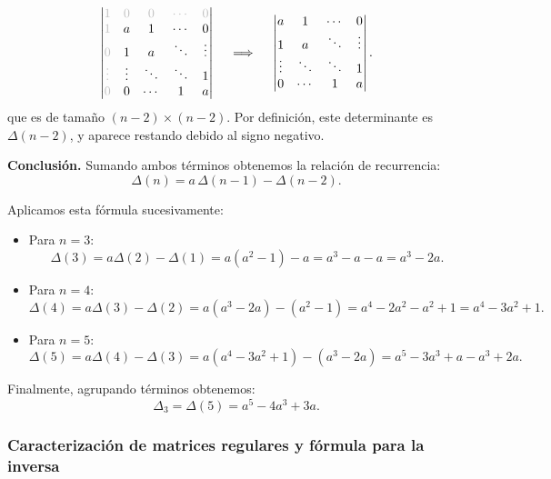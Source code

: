 \documentclass[a4paper,12pt]{article}
\begin{document}
\begin{ejercicio}[title=Ejercicio 40]
\[
\begin{vmatrix}
\color{lightgray}1 & \color{lightgray}0 & \color{lightgray}0 & \color{lightgray}\cdots & \color{lightgray}0\\
\color{lightgray}1 & a & 1 & \cdots & 0\\
\color{lightgray}0 & 1 & a & \ddots & \vdots\\
\color{lightgray}\vdots & \vdots & \ddots & \ddots & 1\\
\color{lightgray}0 & 0 & \cdots & 1 & a
\end{vmatrix}
\quad \implies \quad
\begin{vmatrix}
a & 1 & \cdots & 0\\
1 & a & \ddots & \vdots\\
\vdots & \ddots & \ddots & 1\\
0 & \cdots & 1 & a
\end{vmatrix}.
\]
que es de tamaño $(n-2)\times(n-2)$.  
Por definición, este determinante es $\Delta(n-2)$, y aparece restando debido al signo negativo.

\bigskip

\textbf{Conclusión.}  
Sumando ambos términos obtenemos la relación de recurrencia:
\[
\Delta(n)=a\,\Delta(n-1)-\Delta(n-2).
\]

Aplicamos esta fórmula sucesivamente:

\begin{itemize}
    \item Para $n=3$:
    \[ \Delta(3) = a \Delta(2) - \Delta(1) = a(a^2-1) - a = a^3 - a - a = a^3 - 2a. \]
    
    \item Para $n=4$:
    \[ \Delta(4) = a \Delta(3) - \Delta(2) = a(a^3-2a) - (a^2-1) = a^4 - 2a^2 - a^2 + 1 = a^4 - 3a^2 + 1. \]
    
    \item Para $n=5$:
    \[ \Delta(5) = a \Delta(4) - \Delta(3) = a(a^4 - 3a^2 + 1) - (a^3 - 2a) = a^5 - 3a^3 + a - a^3 + 2a. \]
\end{itemize}

Finalmente, agrupando términos obtenemos:
\[
\Delta_3 = \Delta(5) = \boxed{a^5 - 4a^3 + 3a}.
\]

\end{ejercicio}

\subsubsection{Caracterización de matrices regulares y fórmula para la inversa}
\end{document}
